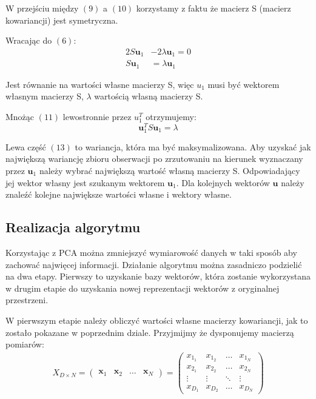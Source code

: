 \documentclass[oneside, eng]{mgr}
\newcommand{\bb}{\textbf}
\begin{document}
W przejściu między $(9)$ a $(10)$ korzystamy z faktu że macierz S (macierz kowariancji) jest symetryczna.

Wracając do $(6)$:
\begin{align}
	2 S \bb{u}_1 &- 2 \lambda \bb{u}_1 = 0	\nonumber \\
	S \bb{u}_1 &= \lambda \bb{u}_1 
\end{align}

Jest równanie na wartości własne macierzy S, więc $u_1$ musi być wektorem własnym macierzy S, $\lambda$ wartością własną macierzy S.

Mnożąc $(11)$ lewostronnie przez $u_1^T$ otrzymujemy:
\begin{equation}
	\bb{u}_1^T S \bb{u}_1 = \lambda
\end{equation}

Lewa część $(13)$ to wariancja, która ma być maksymalizowana. Aby uzyskać jak największą wariancję zbioru obserwacji po zrzutowaniu na kierunek wyznaczany przez $\bb{u}_1$ należy wybrać największą wartość własną macierzy S. Odpowiadający jej wektor własny jest szukanym wektorem $\bb{u}_1$. Dla kolejnych wektorów $\bb{u}$ należy znaleźć kolejne największe wartości własne i wektory własne.

\subsection{Realizacja algorytmu} 
Korzystając z PCA można zmniejszyć wymiarowość danych w taki sposób aby zachować najwięcej informacji. Działanie algorytmu można zasadniczo podzielić na dwa etapy. Pierwszy to uzyskanie bazy wektorów, która zostanie wykorzystana w drugim etapie do uzyskania nowej reprezentacji wektorów z oryginalnej przestrzeni.

W pierwszym etapie należy obliczyć wartości własne macierzy kowariancji, jak to zostało pokazane w poprzednim dziale. Przyjmijmy że dysponujemy macierzą pomiarów:
\begin{align}
	X_{D \times N} = 
	\left( \begin{array}{llll}
		\bb{x}_1 & \bb{x}_2 & \ldots & \bb{x}_N
	\end{array} \right)	
	=
	\left( \begin{array}{llll}
		x_{1_1} & x_{1_2} & \ldots & x_{1_N} \\
		x_{2_1} & x_{2_2} & \ldots & x_{2_N} \\
		\vdots  & \vdots  & \ddots & \vdots  \\
		x_{D_1} & x_{D_2} & \ldots & x_{D_N}
	\end{array} \right)
\end{align}
\end{document}
